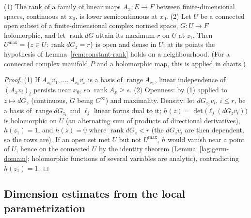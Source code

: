\begin{lemma}
\label{rem:generic-rank}
\leanok
(1) The rank of a family of linear maps \(A_x\colon E\to F\) between finite-dimensional spaces, continuous at \(x_0\), is lower semicontinuous at \(x_0\).
(2) Let \(U\) be a connected open subset of a finite-dimensional complex normed space, \(G\colon U\to F\) holomorphic, and let \(\operatorname{rank}dG\) attain its
maximum \(r\) on \(U\) at \(z_1\). Then \(U^{\max}=\{z\in U:\operatorname{rank}dG_z=r\}\) is open and dense in \(U\); at its points the hypothesis of
Lemma~\ref{rem:constant-rank} holds on a neighbourhood. (For a connected complex manifold \(P\) and a holomorphic map, this is applied in charts.)
\end{lemma}
\begin{proof}
\leanok
(1) If \(A_{x_0}v_1,\dots,A_{x_0}v_s\) is a basis of \(\operatorname{range}A_{x_0}\), linear independence of \((A_xv_i)_i\) persists near \(x_0\), so
\(\operatorname{rank}A_x\ge s\). (2) Openness: by (1) applied to \(z\mapsto dG_z\) (continuous, \(G\) being \(C^\infty\)) and maximality. Density: let \(dG_{z_1}v_i\),
\(i\le r\), be a basis of \(\operatorname{range}dG_{z_1}\) and \(\ell_j\) linear forms dual to it; \(h(z)=\det\bigl(\ell_j(dG_zv_i)\bigr)\) is holomorphic on \(U\)
(an alternating sum of products of directional derivatives), \(h(z_1)=1\), and \(h(z)=0\) where \(\operatorname{rank}dG_z<r\) (the \(dG_zv_i\) are then dependent, so
the rows are). If an open set met \(U\) but not \(U^{\max}\), \(h\) would vanish near a point of \(U\), hence on the connected \(U\) by the identity theorem
(Lemma~\ref{lag:germ-domain}; holomorphic functions of several variables are analytic), contradicting \(h(z_1)=1\).
\end{proof}

\subsection{Dimension estimates from the local parametrization}

